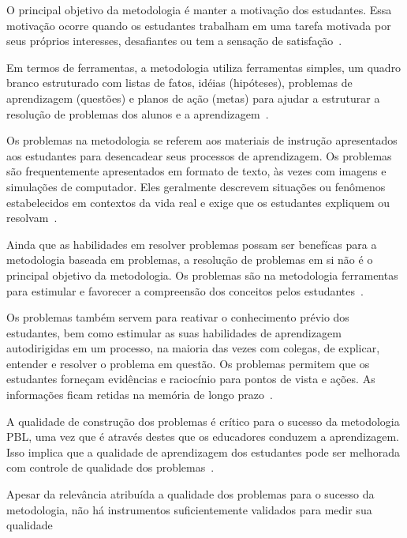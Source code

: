 O principal objetivo da metodologia é manter a motivação
dos estudantes.
Essa motivação ocorre quando os estudantes trabalham em
uma tarefa motivada por seus próprios interesses, desafiantes
ou tem a sensação de satisfação~\cite{hmelo2004problem}.

Em termos de ferramentas, a metodologia utiliza ferramentas simples,
um quadro branco estruturado com listas de fatos,
idéias (hipóteses), problemas de aprendizagem (questões)
e planos de ação (metas) para ajudar a estruturar a
resolução de problemas dos alunos e a
aprendizagem~\cite{hmelo2004problem}. 

Os problemas na metodologia se referem aos materiais de instrução apresentados
aos estudantes para desencadear seus processos de aprendizagem.
Os problemas são frequentemente apresentados em formato de texto,
às vezes com imagens e simulações de computador.
Eles geralmente descrevem situações ou fenômenos estabelecidos
em contextos da vida real e exige que os estudantes expliquem ou
resolvam~\cite{hmelo2004problem}.

Ainda que as habilidades em resolver problemas possam ser benefícas
para a metodologia baseada em problemas, a resolução de problemas em si não é o
principal objetivo da metodologia.
Os problemas são na metodologia ferramentas para estimular e
favorecer a compreensão dos conceitos pelos
estudantes~\cite{wood2003problem, amos1998problem}.

Os problemas também servem para reativar o conhecimento prévio dos
estudantes, bem como estimular as suas habilidades de aprendizagem
autodirigidas em um processo, na maioria das vezes com colegas,
de explicar, entender e resolver o problema em
questão.
Os problemas permitem que os estudantes forneçam evidências
e raciocínio para pontos de vista e ações.
As informações ficam retidas na memória de longo
prazo~\cite{des1999delphi, azer2012twelve}.

A qualidade de construção dos problemas é crítico para o
sucesso da metodologia PBL, uma vez que é através destes
que os educadores conduzem a
aprendizagem.
Isso implica que a qualidade de aprendizagem dos estudantes
pode ser melhorada com controle de qualidade dos
problemas~\cite{santos2009analisa,des1999delphi,dolmans1997seven}.

Apesar da relevância atribuída a qualidade dos problemas para o
sucesso da metodologia, não há instrumentos suficientemente
validados para medir sua
qualidade~\cite{des1999delphi,sockalingam2012assessing}


